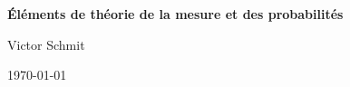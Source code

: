 \begin{titlepage}

	\thispagestyle{empty}

	\begin{center}

		\vspace*{0.2\textheight}

		\begin{minipage}{0.8\textwidth}
			\centering

			{\Huge\bfseries
				Éléments de théorie de la mesure et des probabilités
				\par}

			\vspace{2cm}

			{\Large
				Victor Schmit
				\par}

			\vspace{0.2cm}

			{\normalsize
				\today
				\par}

		\end{minipage}

	\end{center}

\end{titlepage}

